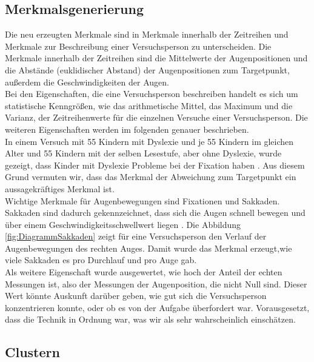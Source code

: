 \documentclass[12pt]{article}
\begin{document}
\subsection*{Merkmalsgenerierung}
Die neu erzeugten Merkmale sind in Merkmale innerhalb der Zeitreihen und Merkmale zur Beschreibung einer Versuchsperson zu unterscheiden. Die Merkmale innerhalb der Zeitreihen sind die Mittelwerte der Augenpositionen und die Abst\"ande (euklidischer Abstand) der Augenpositionen zum Targetpunkt, au\ss{}erdem die Geschwindigkeiten der Augen.\\
Bei den Eigenschaften, die eine Versuchsperson beschreiben handelt es sich um statistische Kenngr\"o\ss{}en, wie das arithmetische Mittel, das Maximum und die Varianz, der Zeitreihenwerte f\"ur die einzelnen Versuche einer Versuchsperson. Die weiteren Eigenschaften werden im folgenden genauer beschrieben.\\
In einem Versuch mit 55 Kindern mit Dyslexie und je 55 Kindern im gleichen Alter und 55 Kindern mit der selben Lesestufe, aber ohne Dyslexie, wurde gezeigt, dass Kinder mit Dyslexie Probleme bei der Fixation haben \cite{Tiadi2016}. Aus diesem Grund vermuten wir, dass das Merkmal der Abweichung zum Targetpunkt ein aussagekr\"aftiges Merkmal ist.\\
Wichtige Merkmale f\"ur Augenbewegungen sind Fixationen und Sakkaden. Sakkaden sind dadurch gekennzeichnet, dass sich die Augen schnell bewegen und \"uber einem Geschwindigkeits\-schwellwert liegen \cite[p.~152]{EyeTracking}. Die Abbildung \ref{fig:DiagrammSakkaden} zeigt f\"ur eine Versuchsperson den Verlauf der Augenbewegungen des rechten Auges. Damit wurde das Merkmal erzeugt,wie viele Sakkaden es pro Durchlauf und pro Auge gab.\\
Als weitere Eigenschaft wurde ausgewertet, wie hoch der Anteil der echten Messungen ist, also der Messungen der Augenposition, die nicht Null sind. Dieser Wert k\"onnte Auskunft dar\"uber geben, wie gut sich die Versuchsperson konzentrieren konnte, oder ob es von der Aufgabe \"uberfordert war. Vorausgesetzt, dass die Technik in Ordnung war, was wir als sehr wahrscheinlich einsch\"atzen.


\subsection*{Clustern}
\end{document}

